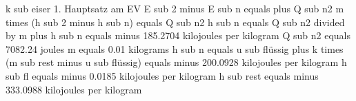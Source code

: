 k sub eiser  
1. Hauptsatz am EV  
E sub 2 minus E sub n equals plus Q sub n2  
m times (h sub 2 minus h sub n) equals Q sub n2  
h sub n equals Q sub n2 divided by m plus h sub n equals minus 185.2704 kilojoules per kilogram  
Q sub n2 equals 7082.24 joules  
m equals 0.01 kilograms  
h sub n equals u sub flüssig plus k times (m sub rest minus u sub flüssig) equals minus 200.0928 kilojoules per kilogram  
h sub fl equals minus 0.0185 kilojoules per kilogram  
h sub rest equals minus 333.0988 kilojoules per kilogram